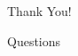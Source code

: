 \documentclass[aspectratio=169]{beamer}
\begin{document}
\begin{frame}{}
	\begin{center}
		\LARGE Thank You!
	\end{center}
	\begin{center}
		\large Questions
	\end{center}
\end{frame}
\end{document}
